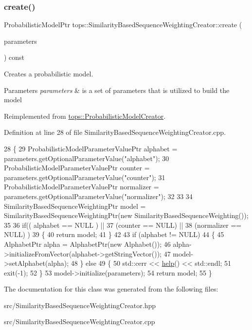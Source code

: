 \subsubsection{\texorpdfstring{create()}{create()}}
{\footnotesize\ttfamily Probabilistic\+Model\+Ptr tops\+::\+Similarity\+Based\+Sequence\+Weighting\+Creator\+::create (\begin{DoxyParamCaption}\item[{\hyperlink{classtops_1_1ProbabilisticModelParameters}{Probabilistic\+Model\+Parameters} \&}]{parameters }\end{DoxyParamCaption}) const\hspace{0.3cm}{\ttfamily [virtual]}}



Creates a probabilistic model. 


\begin{DoxyParams}{Parameters}
{\em parameters} & is a set of parameters that is utilized to build the model \\
\hline
\end{DoxyParams}


Reimplemented from \hyperlink{classtops_1_1ProbabilisticModelCreator_afed6c8ffa45fff446bdaa8b533da8f7c}{tops\+::\+Probabilistic\+Model\+Creator}.



Definition at line 28 of file Similarity\+Based\+Sequence\+Weighting\+Creator.\+cpp.


\begin{DoxyCode}
28                                                                                                            
                  \{
29     ProbabilisticModelParameterValuePtr alphabet = parameters.getOptionalParameterValue(\textcolor{stringliteral}{"alphabet"});
30     ProbabilisticModelParameterValuePtr counter = parameters.getOptionalParameterValue(\textcolor{stringliteral}{"counter"});
31     ProbabilisticModelParameterValuePtr normalizer = parameters.getOptionalParameterValue(\textcolor{stringliteral}{"normalizer"});
32 
33 
34     SimilarityBasedSequenceWeightingPtr model = SimilarityBasedSequenceWeightingPtr(\textcolor{keyword}{new} 
      SimilarityBasedSequenceWeighting());
35 
36     \textcolor{keywordflow}{if}(( alphabet == NULL ) ||
37        (counter == NULL) ||
38        (normalizer == NULL) )
39       \{
40         \textcolor{keywordflow}{return} model;
41       \}
42 
43     \textcolor{keywordflow}{if} (alphabet != NULL)
44       \{
45         AlphabetPtr alpha = AlphabetPtr(\textcolor{keyword}{new} Alphabet());
46         alpha->initializeFromVector(alphabet->getStringVector());
47         model->setAlphabet(alpha);
48       \} \textcolor{keywordflow}{else}
49       \{
50         std::cerr << \hyperlink{classtops_1_1SimilarityBasedSequenceWeightingCreator_ac47fccb399179b4406352c76815dbbc4}{help}() << std::endl;
51         exit(-1);
52       \}
53     model->initialize(parameters);
54     \textcolor{keywordflow}{return} model;
55   \}
\end{DoxyCode}


The documentation for this class was generated from the following files\+:\begin{DoxyCompactItemize}
\item 
src/Similarity\+Based\+Sequence\+Weighting\+Creator.\+hpp\item 
src/Similarity\+Based\+Sequence\+Weighting\+Creator.\+cpp\end{DoxyCompactItemize}
